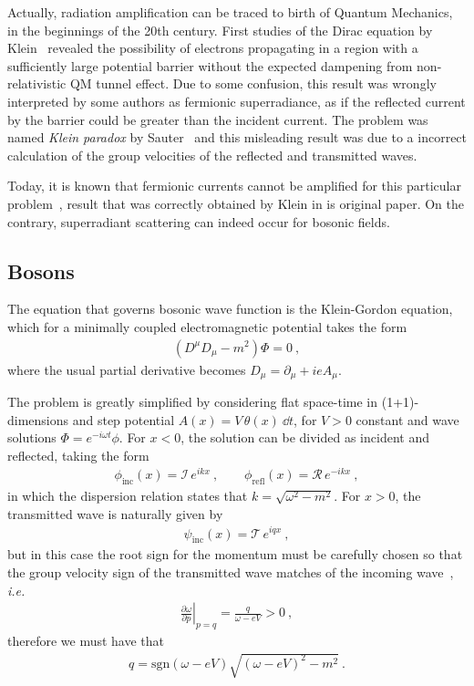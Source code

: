 Actually, radiation amplification can be traced to birth of Quantum Mechanics, in the beginnings of the 20th century. 
First studies of the Dirac equation by Klein~\cite{Klein1929} revealed the possibility of electrons propagating in a region with a sufficiently large potential barrier without the expected dampening from non-relativistic QM tunnel effect.
Due to some confusion, this result was wrongly interpreted by some authors as fermionic superradiance, as if the reflected current by the barrier could be greater than the incident current. 
The problem was named \emph{Klein paradox} by Sauter~\cite{Sauter1931} and this misleading result was due to a incorrect calculation of the group velocities of the reflected and transmitted waves. 

Today, it is known that fermionic currents cannot be amplified for this particular problem~\cite{Klein1929,Manogue1988}, result that was correctly obtained by Klein in is original paper. 
On the contrary, superradiant scattering can indeed occur for bosonic fields.

\subsection{Bosons}

The equation that governs bosonic wave function is the Klein-Gordon equation, which for a minimally coupled electromagnetic potential takes the form
\begin{align}
    (D^\mu D_\mu - m^2) \Phi = 0 ~,
    \label{eq:KleinGordon}
\end{align}
where the usual partial derivative becomes $D_\mu = \partial_\mu + i e A_\mu$. 

The problem is greatly simplified by considering flat space-time in (1+1)-dimensions and step potential $A(x) = V\,\theta(x) ~\dd t$, for $V>0$ constant and wave solutions $\Phi= e^{-i \omega t} \phi$.
For $x<0$, the solution can be divided as incident and reflected, taking the form
\begin{align}
    \phi_\mathrm{inc}(x) = \mathcal{I}\, e^{i k x}  ~, \qquad
    \phi_\mathrm{refl}(x) = \mathcal{R}\, e^{- i k x} ~,
    \label{eq:KGsolneg}
\end{align}
in which the dispersion relation states that $k=\sqrt{\omega^2-m^2}$. For $x>0$, the transmitted wave is naturally given by 
\begin{align}
    \psi_\mathrm{inc}(x) = \mathcal{T}\, e^{i q x}  ~,
    \label{eq:KGsolpos}
\end{align}
but in this case the root sign for the momentum must be carefully chosen so that the group velocity sign of the transmitted wave matches of the incoming wave~\cite{Manogue1988}, \textit{i.e.}
\begin{align}
    \left.\frac{\partial \omega}{\partial p}\right|_{p=q} = \frac{q}{\omega - e V} > 0 ~,
    \label{eq:KGphasev}
\end{align}
therefore we must have that
\begin{align}
    q = \mathrm{sgn}(\omega - e V) \sqrt{ (\omega - e V)^2 - m^2 } ~.
    \label{eq:KGq}
\end{align}

